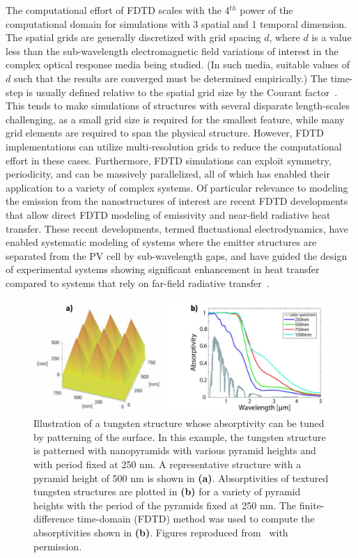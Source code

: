 \documentclass[review]{elsarticle}
\begin{document}
The computational effort of FDTD scales with the 4$^{th}$ power of the computational domain for 
simulations with 3 spatial and 1 temporal dimension.
The spatial grids are generally discretized with grid spacing $d$, where $d$ is a value less
than the sub-wavelength electromagnetic field variations of interest in the complex
optical response media being studied. (In such media, suitable values of $d$ 
such that the results are converged must
be determined empirically.)
The time-step is usually defined relative to the spatial grid size by the Courant 
factor~\cite{Taflove_FDTD}.   This tends to make simulations of structures with several disparate length-scales challenging, as a small
grid size is required for the smallest feature, while many grid elements are required to span the physical structure.  However, FDTD 
implementations can utilize multi-resolution grids to reduce the computational effort in these cases.  Furthermore, FDTD simulations 
can exploit symmetry, periodicity, and can be massively parallelized, all of which has enabled their application to a variety of complex systems.
Of particular relevance to modeling the emission from the nanostructures of interest are recent
FDTD developments that allow direct FDTD modeling of emissivity and near-field radiative heat transfer\cite{rodriguez2011,datas2013,didari2014,didari2015}.  These recent developments, termed fluctuational electrodynamics,
have enabled systematic modeling of systems where the emitter structures are separated from the PV cell by sub-wavelength gaps, and
have guided the design of experimental systems showing significant enhancement in heat transfer compared to systems that 
rely on far-field radiative transfer~\cite{SZF_NatNano_2016}.


\begin{figure}[ht]
        \includegraphics[width=\textwidth]{FDTD_Modeling}
        \caption{\label{FDTD_Structures}  Illustration of a tungsten structure whose
absorptivity can be tuned by patterning of the surface.  In this example, the tungsten
structure is patterned with nanopyramids with various pyramid heights and with period fixed
at  250 nm.  A representative structure with a pyramid height of 500 nm is shown in {\bf (a)}.
Absorptivities of textured tungsten structures
are plotted in {\bf (b)} for a variety of pyramid heights with the period of the pyramids
fixed at 250 nm.  The finite-difference time-domain (FDTD) method
was used to compute the absorptivities shown in {\bf (b)}.  
Figures reproduced from~\cite{RF_OptExp_2009} with permission.}
\end{figure}
\end{document}
